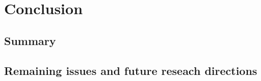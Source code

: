 \documentclass[master]{NTHUthesis}
\begin{document}
\chapter{Conclusion}
\lipsum[1]
\section{Summary}
\lipsum[1]
\section{Remaining issues and future reseach directions}
\lipsum[1]


% 


\newpage
{}
\printbibliography[title={References}]
\end{document}
